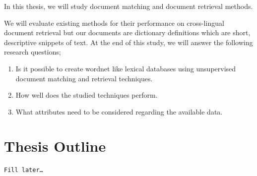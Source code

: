In this thesis, we will study document matching and document retrieval methods.

We will evaluate existing methods for their performance on cross-lingual document retrieval but our documents are dictionary definitions which are short, descriptive snippets of text.
At the end of this study, we will answer the following research questions;

\begin{enumerate}
    \item Is it possible to create wordnet like lexical databases using unsupervised document matching and retrieval techniques.
    \item How well does the studied techniques perform.
    \item What attributes need to be considered regarding the available data.
\end{enumerate}

\section{Thesis Outline}%
\label{sec:thesis_outline}
\texttt{Fill later\ldots}

